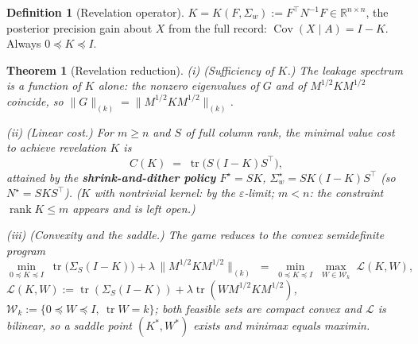 \documentclass[11pt]{article}
\newtheorem{theorem}{Theorem}
\theoremstyle{definition}
\newtheorem{definition}{Definition}
\newcommand{\tr}{\operatorname{tr}}
\newcommand{\KF}[1]{\lVert #1 \rVert_{(k)}}
\begin{document}
\begin{definition}[Revelation operator]
$K = K(F,\Sigma_w) := F^\top N^{-1} F \in \mathbb R^{n\times n}$,
the posterior precision gain about $X$ from the full record:
$\operatorname{Cov}(X\mid A) = I - K$. Always $0\preceq K\preceq I$.
\end{definition}

\begin{theorem}[Revelation reduction]\label{thm:reduction}
\emph{(i) (Sufficiency of $K$.)} The leakage spectrum is a function
of $K$ alone: the nonzero eigenvalues of $G$ and of
$M^{1/2}KM^{1/2}$ coincide, so $\KF{G} = \KF{M^{1/2}KM^{1/2}}$.

\emph{(ii) (Linear cost.)} For $m\ge n$ and $S$ of full column rank,
the minimal value cost to achieve revelation $K$ is
\[
C(K) \;=\; \tr\!\big(S(I-K)S^\top\big),
\]
attained by the \textbf{shrink-and-dither policy}
$F^\star = SK$, $\Sigma_w^\star = SK(I-K)S^\top$ (so
$N^\star = SKS^\top$). ($K$ with nontrivial kernel: by the
$\varepsilon$-limit; $m<n$: the constraint
$\operatorname{rank} K\le m$ appears and is left open.)

\emph{(iii) (Convexity and the saddle.)} The game reduces to the
convex semidefinite program
\[
\min_{0\preceq K\preceq I}\;
\tr\big(\Sigma_S(I-K)\big) + \lambda\,\KF{M^{1/2}KM^{1/2}}
\;=\;
\min_{0\preceq K\preceq I}\;\max_{W\in\mathcal W_k}\;
\mathcal L(K,W),
\]
$\mathcal L(K,W) := \tr(\Sigma_S(I-K)) + \lambda\tr(W
M^{1/2}KM^{1/2})$, $\mathcal W_k := \{0\preceq W\preceq I,\ \tr W =
k\}$; both feasible sets are compact convex and $\mathcal L$ is
bilinear, so a saddle point $(K^\ast, W^\ast)$ exists and minimax
equals maximin.
\end{theorem}
\end{document}
